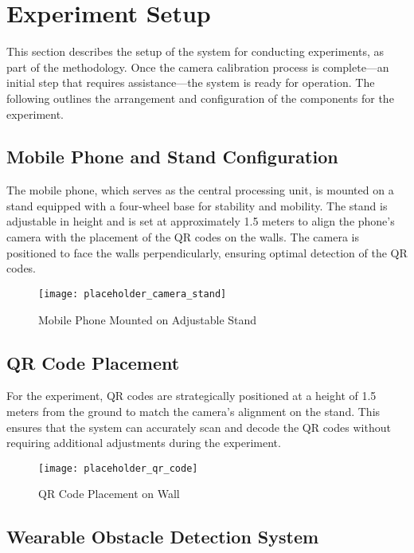 \section{Experiment Setup}

This section describes the setup of the system for conducting experiments, as part of the methodology. Once the camera calibration process is complete—an initial step that requires assistance—the system is ready for operation. The following outlines the arrangement and configuration of the components for the experiment.

\subsection{Mobile Phone and Stand Configuration}

The mobile phone, which serves as the central processing unit, is mounted on a stand equipped with a four-wheel base for stability and mobility. The stand is adjustable in height and is set at approximately 1.5 meters to align the phone's camera with the placement of the QR codes on the walls. The camera is positioned to face the walls perpendicularly, ensuring optimal detection of the QR codes.

\begin{figure}[h]
	\centering
	\texttt{[image: placeholder\_camera\_stand]}
	\caption{Mobile Phone Mounted on Adjustable Stand}
	\label{fig:camera_stand}
\end{figure}

\subsection{QR Code Placement}

For the experiment, QR codes are strategically positioned at a height of 1.5 meters from the ground to match the camera's alignment on the stand. This ensures that the system can accurately scan and decode the QR codes without requiring additional adjustments during the experiment.

\begin{figure}[h]
	\centering
	\texttt{[image: placeholder\_qr\_code]}
	\caption{QR Code Placement on Wall}
	\label{fig:qr_code}
\end{figure}

\subsection{Wearable Obstacle Detection System}

